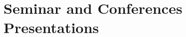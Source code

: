 \documentclass[10pt,letterpaper]{article}
\renewenvironment{itemize}{
  \begin{list}{}{
      \setlength{\leftmargin}{1.5em}
      \setlength{\itemsep}{0.25em}
      \setlength{\parskip}{0pt}
      \setlength{\parsep}{0.25em}
    }
}{
  \end{list}
}
\begin{document}
%



%

\section*{Seminar and Conferences Presentations}
\end{document}
